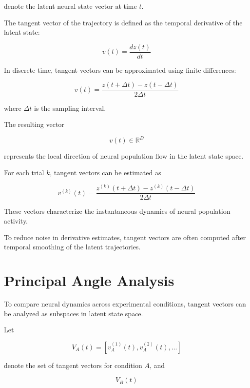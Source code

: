\documentclass[11pt]{report}
\begin{document}
denote the latent neural state vector at time $t$.

The tangent vector of the trajectory is defined as the temporal
derivative of the latent state:

\begin{equation}
v(t) = \frac{dz(t)}{dt}
\end{equation}

In discrete time, tangent vectors can be approximated using finite
differences:

\begin{equation}
v(t) =
\frac{z(t+\Delta t) - z(t-\Delta t)}{2\Delta t}
\end{equation}

where $\Delta t$ is the sampling interval.

The resulting vector

\begin{equation}
v(t) \in \mathbb{R}^{D}
\end{equation}

represents the local direction of neural population flow in the latent
state space.

For each trial $k$, tangent vectors can be estimated as

\begin{equation}
v^{(k)}(t) =
\frac{z^{(k)}(t+\Delta t) - z^{(k)}(t-\Delta t)}{2\Delta t}
\end{equation}

These vectors characterize the instantaneous dynamics of neural
population activity.

To reduce noise in derivative estimates, tangent vectors are often
computed after temporal smoothing of the latent trajectories.

\section{Principal Angle Analysis}

To compare neural dynamics across experimental conditions, tangent
vectors can be analyzed as subspaces in latent state space.

Let

\begin{equation}
V_A(t) =
[v_A^{(1)}(t), v_A^{(2)}(t), \dots]
\end{equation}

denote the set of tangent vectors for condition $A$, and

\begin{equation}
V_B(t)
\end{equation}
\end{document}
